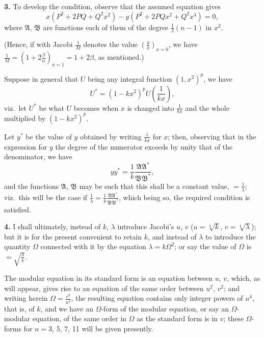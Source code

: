 \documentclass[11pt,a4paper]{article}
\theoremstyle{plain}
\begin{document}
\medskip
\noindent\textbf{3.} To develop the condition, observe that the assumed equation gives
\[
x(P^2 + 2PQ + Q^2x^2) - y(P^2 + 2PQx^2 + Q^2x^4) = 0,
\]
where $\mathfrak{A}$, $\mathfrak{B}$ are functions each of them of the degree $\frac{1}{2}(n - 1)$ in $x^2$.

(Hence, if with Jacobi $\frac{1}{M}$ denotes the value $\left(\frac{y}{x}\right)_{x=0}$, we have $\frac{1}{M} = \left(1 + 2\frac{\beta}{\alpha}\right)_{x=1} = 1 + 2\beta$, as mentioned.)

Suppose in general that $U$ being any integral function $(1, x^2)^p$, we have
\[
U^* = (1 - kx^2)^p U\left(\frac{1}{kx}\right),
\]
viz.\ let $U^*$ be what $U$ becomes when $x$ is changed into $\frac{1}{kx}$ and the whole multiplied by $(1 - kx^2)^p$.

Let $y^*$ be the value of $y$ obtained by writing $\frac{1}{kx}$ for $x$; then, observing that in the expression for $y$ the degree of the numerator exceeds by unity that of the denominator, we have
\[
yy^* = \frac{1}{k}\frac{\mathfrak{A}\mathfrak{A}^*}{\mathfrak{B}\mathfrak{B}^*},
\]
and the functions $\mathfrak{A}$, $\mathfrak{B}$ may be such that this shall be a constant value, $= \frac{1}{\lambda}$; viz.\ this will be the case if $\frac{1}{\lambda} = \frac{1}{k}\frac{\mathfrak{A}\mathfrak{A}^*}{\mathfrak{B}\mathfrak{B}^*}$, which being so, the required condition is satisfied.

\medskip
\noindent\textbf{4.} I shall ultimately, instead of $k$, $\lambda$ introduce Jacobi's $u$, $v$ ($u = \sqrt[4]{k}$, $v = \sqrt[4]{\lambda}$); but it is for the present convenient to retain $k$, and instead of $\lambda$ to introduce the quantity $\Omega$ connected with it by the equation $\lambda = k\Omega^2$; or say the value of $\Omega$ is $= \sqrt{\frac{\lambda}{k}}$.

The modular equation in its standard form is an equation between $u$, $v$, which, as will appear, gives rise to an equation of the same order between $u^2$, $v^2$; and writing herein $\Omega = \frac{v^2}{u^2}$, the resulting equation contains only integer powers of $u^4$, that is, of $k$, and we have an $\Omega$-form of the modular equation, or say an $\Omega$-modular equation, of the same order in $\Omega$ as the standard form is in $v$; these $\Omega$-forms for $n = 3$, 5, 7, 11 will be given presently.
\end{document}
